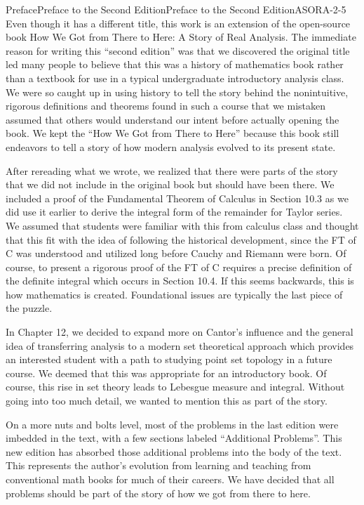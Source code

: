 \documentclass[oneside,10pt,]{book}
\numberwithin{equation}{part}
\begin{document}
\begin{preface}{Preface}{Preface to the Second Edition}{}{Preface to the Second Edition}{}{}{ASORA-2-5}
Even though it has a different title, this work is an extension of the open-source book How We Got from There to Here: A Story of Real Analysis.  The immediate reason for writing this “second edition” was that we discovered the original title led many people to believe that this was a history of mathematics book rather than a textbook for use in a typical undergraduate introductory analysis class.  We were so caught up in using history to tell the story behind the nonintuitive, rigorous definitions and theorems found in such a course that we mistaken assumed that others would understand our intent before actually opening the book.  We kept the “How We Got from There to Here” because this book still endeavors to tell a story of how modern analysis evolved to its present state.%
\par
After rereading what we wrote, we realized that there were parts of the story that we did not include in the original book but should have been there.  We included a proof of the Fundamental Theorem of Calculus in Section 10.3 as we did use it earlier to derive the integral form of the remainder for Taylor series.  We assumed that students were familiar with this from calculus class and thought that this fit with the idea of following the historical development, since the FT of C was understood and utilized long before Cauchy and Riemann were born.  Of course, to present a rigorous proof of the FT of C requires a precise definition of the definite integral which occurs in Section 10.4.  If this seems backwards, this is how mathematics is created.  Foundational issues are typically the last piece of the puzzle.%
\par
In Chapter 12, we decided to expand more on Cantor’s influence and the general idea of transferring analysis to a modern set theoretical approach which provides an interested student with a path to studying point set topology in a future course.  We deemed that this was appropriate for an introductory book.  Of course, this rise in set theory leads to Lebesgue measure and integral.  Without going into too much detail, we wanted to mention this as part of the story.%
\par
On a more nuts and bolts level, most of the problems in the last edition were imbedded in the text, with a few sections labeled “Additional Problems”.  This new edition has absorbed those additional problems into the body of the text.  This represents the author’s evolution from learning and teaching from conventional math books for much of their careers.  We have decided that all problems should be part of the story of how we got from there to here.%
\end{preface}
\end{document}
